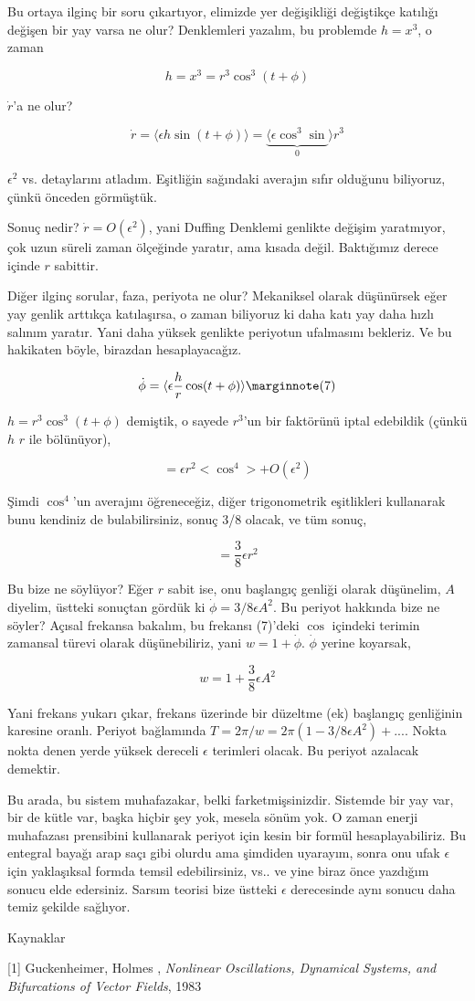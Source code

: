 \documentclass[12pt,fleqn]{article}\usepackage{../../common}
\begin{document}
Bu ortaya ilginç bir soru çıkartıyor, elimizde yer değişikliği değiştikçe
katılığı değişen bir yay varsa ne olur? Denklemleri yazalım, bu problemde $h =
x^3$, o zaman

$$ h = x^3 = r^3 \cos^3(t+\phi) $$

$\dot{r}$'a ne olur?

$$
\dot{r} = \langle \epsilon h \sin(t+\phi) \rangle =
\underbrace{\langle \epsilon \cos^3 \sin}_{0}  \rangle r^3
$$

$\epsilon^2$ vs. detaylarını atladım. Eşitliğin sağındaki averajın sıfır
olduğunu biliyoruz, çünkü önceden görmüştük.

Sonuç nedir? $\dot{r} = O(\epsilon^2)$, yani Duffing Denklemi genlikte değişim
yaratmıyor, çok uzun süreli zaman ölçeğinde yaratır, ama kısada
değil. Baktığımız derece içinde $r$ sabittir.

Diğer ilginç sorular, faza, periyota ne olur? Mekaniksel olarak düşünürsek eğer
yay genlik arttıkça katılaşırsa, o zaman biliyoruz ki daha katı yay daha hızlı
salınım yaratır. Yani daha yüksek genlikte periyotun ufalmasını bekleriz. Ve
bu hakikaten böyle, birazdan hesaplayacağız.

$$
\dot{\phi} = \langle \epsilon \frac{h}{r} \cos (t+\phi) \rangle
\mlabel{7}
$$

$h = r^3 \cos^3(t+\phi)$ demiştik, o sayede $r^3$'un bir faktörünü iptal
edebildik (çünkü $h$ $r$ ile bölünüyor), 

$$ = \epsilon r^2 < \cos^4 > + O(\epsilon^2)  $$

Şimdi $\cos^4$'un averajını öğreneceğiz, diğer trigonometrik eşitlikleri
kullanarak bunu kendiniz de bulabilirsiniz, sonuç 3/8 olacak, ve tüm sonuç,

$$ = \frac{3}{8}\epsilon r^2 $$

Bu bize ne söylüyor? Eğer $r$ sabit ise, onu başlangıç genliği olarak düşünelim,
$A$ diyelim, üstteki sonuçtan gördük ki $\dot{\phi} = 3/8 \epsilon A^2$. Bu
periyot hakkında bize ne söyler? Açısal frekansa bakalım, bu frekansı (7)'deki
$\cos$ içindeki terimin zamansal türevi olarak düşünebiliriz, yani $w =
1+\dot{\phi}$. $\dot{\phi}$ yerine koyarsak,

$$ w = 1+\frac{3}{8} \epsilon A^2 $$

Yani frekans yukarı çıkar, frekans üzerinde bir düzeltme (ek) başlangıç
genliğinin karesine oranlı. Periyot bağlamında $T = 2\pi / w = 2\pi (1-3/8
\epsilon A^2) + ...$. Nokta nokta denen yerde yüksek dereceli $\epsilon$
terimleri olacak. Bu periyot azalacak demektir.

Bu arada, bu sistem muhafazakar, belki farketmişsinizdir. Sistemde bir yay var,
bir de kütle var, başka hiçbir şey yok, mesela sönüm yok. O zaman enerji
muhafazası prensibini kullanarak periyot için kesin bir formül
hesaplayabiliriz. Bu entegral bayağı arap saçı gibi olurdu ama şimdiden
uyarayım, sonra onu ufak $\epsilon$ için yaklaşıksal formda temsil
edebilirsiniz, vs.. ve yine biraz önce yazdığım sonucu elde edersiniz. Sarsım
teorisi bize üstteki $\epsilon$ derecesinde aynı sonucu daha temiz şekilde
sağlıyor.

Kaynaklar

[1] Guckenheimer, Holmes , {\em Nonlinear Oscillations, Dynamical Systems, and
Bifurcations of Vector Fields}, 1983
\end{document}
